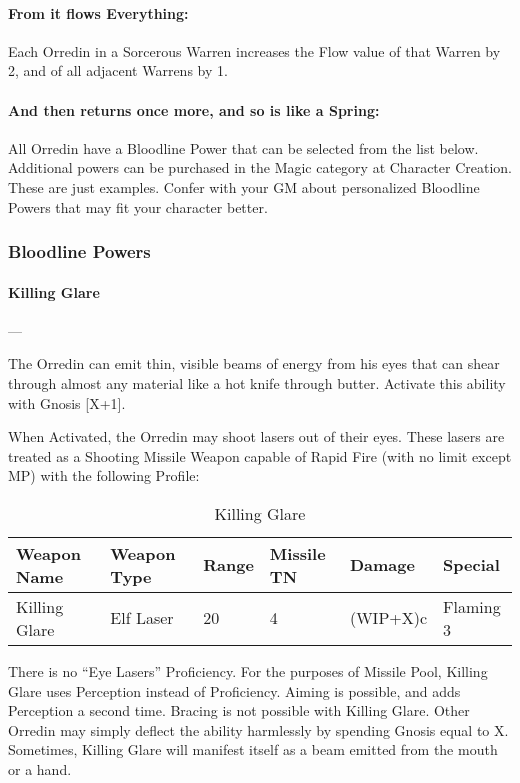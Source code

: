 \documentclass[oneside,11pt,english]{book}
\begin{document}
\paragraph{From it flows Everything:} Each Orredin in a Sorcerous Warren increases the Flow value of that Warren by 2, and of all adjacent Warrens by 1.
\paragraph{And then returns once more, and so is like a Spring:} All Orredin have a Bloodline Power that can be selected from the list below. Additional powers can be purchased in the Magic category at Character Creation. These are just examples. Confer with your GM about personalized Bloodline Powers that may fit your character better.
\subsubsection{Bloodline Powers}
\paragraph{\large\label{man:Killing Glare}Killing Glare}---\quad{\large[X+1]}\par
The Orredin can emit thin, visible beams of energy from his eyes that can shear through almost any material like a hot knife through butter. Activate this ability with Gnosis [X+1].

When Activated, the Orredin may shoot lasers out of their eyes. These lasers are treated as a Shooting 
Missile Weapon capable of Rapid Fire (with no limit except MP) with the following Profile:

\begin{table}[!ht]
  \captionsetup{textformat=empty,labelformat=blank}
  \caption{Killing Glare}
  \label{tab:Killing Glare}
  \begin{tabu} to \textwidth {XXX[-1,c]X[c]XX}
    Weapon Name&Weapon Type&Range& Missile TN&Damage&Special\\\toprule
    Killing Glare&Elf Laser&20&4&(WIP+X)c&Flaming 3\\
  \end{tabu}
\end{table}

There is no “Eye Lasers” Proficiency. For the purposes of Missile Pool, Killing
Glare uses Perception instead of Proficiency. Aiming is possible, and adds
Perception a second time. Bracing is not possible with Killing Glare. Other
Orredin may simply deflect the ability harmlessly by spending Gnosis equal to X.
Sometimes, Killing Glare will manifest itself as a beam emitted from the mouth
or a hand. 
\end{document}
